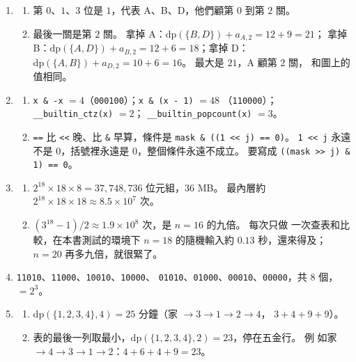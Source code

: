 \begin{enumerate}
\item
\begin{enumerate}
\item 第 $0$、$1$、$3$ 位是 $1$，代表 A、B、D，他們顧第 $0$ 到第 $2$ 關。
\item 最後一關是第 $2$ 關。 拿掉 A：$\mathrm{dp}(\{B, D\}) + a_{A,2} = 12 + 9 = 21$；
拿掉 B：$\mathrm{dp}(\{A, D\}) + a_{B,2} = 12 + 6 = 18$；拿掉 D：
$\mathrm{dp}(\{A, B\}) + a_{D,2} = 10 + 6 = 16$。 最大是 $21$，A 顧第 $2$ 關，
和圖上的值相同。
\end{enumerate}

\item
\begin{enumerate}
\item \texttt{x \& -x} $= 4$（\texttt{000100}）；\texttt{x \& (x - 1)} $= 48$
（\texttt{110000}）；\texttt{\_\_builtin\_ctz(x)} $= 2$；
\texttt{\_\_builtin\_popcount(x)} $= 3$。
\item \texttt{==} 比 \texttt{<<} 晚、比 \texttt{\&} 早算，條件是
\texttt{mask \& ((1 << j) == 0)}。 \texttt{1 << j} 永遠不是 $0$，括號裡永遠是
$0$，整個條件永遠不成立。 要寫成 \texttt{((mask >> j) \& 1) == 0}。
\end{enumerate}

\item
\begin{enumerate}
\item $2^{18} \times 18 \times 8 = 37{,}748{,}736$ 位元組，$36$ MB。 最內層約
$2^{18} \times 18 \times 18 \approx 8.5 \times 10^7$ 次。
\item $(3^{18} - 1)/2 \approx 1.9 \times 10^8$ 次，是 $n = 16$ 的九倍。 每次只做
一次查表和比較，在本書測試的環境下 $n = 18$ 的隨機輸入約 $0.13$ 秒，還來得及；
$n = 20$ 再多九倍，就很緊了。
\end{enumerate}

\item \texttt{11010}、\texttt{11000}、\texttt{10010}、\texttt{10000}、
\texttt{01010}、\texttt{01000}、\texttt{00010}、\texttt{00000}，共 $8$ 個，
$= 2^3$。

\item
\begin{enumerate}
\item $\mathrm{dp}(\{1, 2, 3, 4\}, 4) = 25$ 分鐘（家 $\to 3 \to 1 \to 2 \to 4$，
$3 + 4 + 9 + 9$）。
\item 表的最後一列取最小，$\mathrm{dp}(\{1, 2, 3, 4\}, 2) = 23$，停在五金行。 例
如家 $\to 4 \to 3 \to 1 \to 2$：$4 + 6 + 4 + 9 = 23$。
\end{enumerate}


\end{enumerate}
